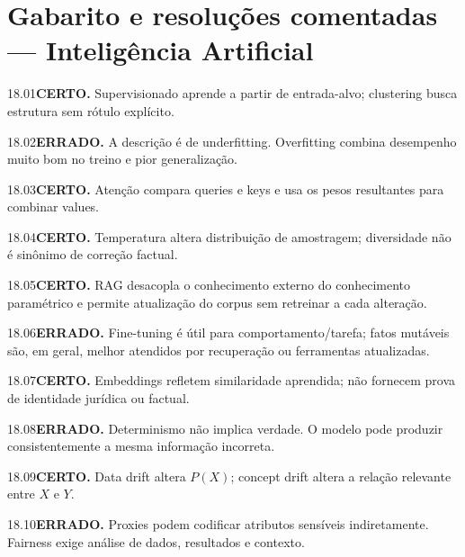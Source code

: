 \section{Gabarito e resoluções comentadas — Inteligência Artificial}

\begin{solucao}{18.01}\textbf{CERTO.} Supervisionado aprende a partir de entrada-alvo; clustering busca estrutura sem rótulo explícito.\end{solucao}
\begin{solucao}{18.02}\textbf{ERRADO.} A descrição é de underfitting. Overfitting combina desempenho muito bom no treino e pior generalização.\end{solucao}
\begin{solucao}{18.03}\textbf{CERTO.} Atenção compara queries e keys e usa os pesos resultantes para combinar values.\end{solucao}
\begin{solucao}{18.04}\textbf{CERTO.} Temperatura altera distribuição de amostragem; diversidade não é sinônimo de correção factual.\end{solucao}
\begin{solucao}{18.05}\textbf{CERTO.} RAG desacopla o conhecimento externo do conhecimento paramétrico e permite atualização do corpus sem retreinar a cada alteração.\end{solucao}
\begin{solucao}{18.06}\textbf{ERRADO.} Fine-tuning é útil para comportamento/tarefa; fatos mutáveis são, em geral, melhor atendidos por recuperação ou ferramentas atualizadas.\end{solucao}
\begin{solucao}{18.07}\textbf{CERTO.} Embeddings refletem similaridade aprendida; não fornecem prova de identidade jurídica ou factual.\end{solucao}
\begin{solucao}{18.08}\textbf{ERRADO.} Determinismo não implica verdade. O modelo pode produzir consistentemente a mesma informação incorreta.\end{solucao}
\begin{solucao}{18.09}\textbf{CERTO.} Data drift altera $P(X)$; concept drift altera a relação relevante entre $X$ e $Y$.\end{solucao}
\begin{solucao}{18.10}\textbf{ERRADO.} Proxies podem codificar atributos sensíveis indiretamente. Fairness exige análise de dados, resultados e contexto.\end{solucao}

